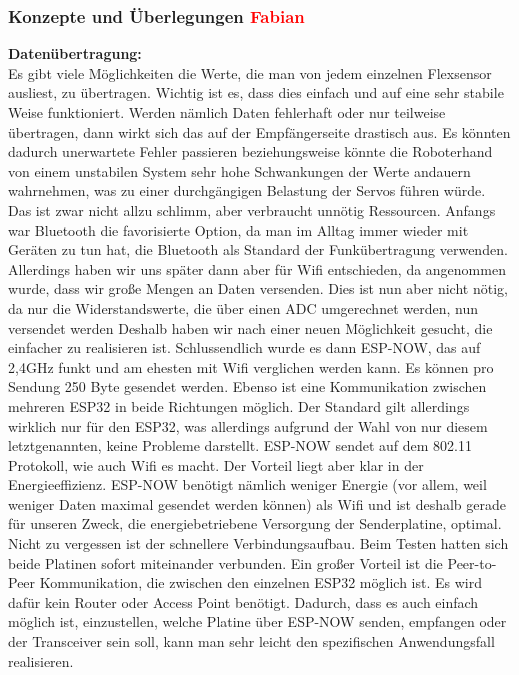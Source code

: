 \documentclass[11pt]{article}
\begin{document}
\subsubsection{Konzepte und Überlegungen \textcolor{red}{Fabian}}
\textbf{Datenübertragung:}
\\
Es gibt viele Möglichkeiten die Werte, die man von jedem einzelnen Flexsensor ausliest, zu übertragen. Wichtig ist es, dass 
dies einfach und auf eine sehr stabile Weise funktioniert. Werden nämlich Daten fehlerhaft oder nur teilweise übertragen, dann 
wirkt sich das auf der Empfängerseite drastisch aus. Es könnten dadurch unerwartete Fehler passieren beziehungsweise könnte die 
Roboterhand von einem unstabilen System sehr hohe Schwankungen der Werte andauern wahrnehmen, was zu einer durchgängigen 
Belastung der Servos führen würde. Das ist zwar nicht allzu schlimm, aber verbraucht unnötig Ressourcen. Anfangs war Bluetooth 
die favorisierte Option, da man im Alltag immer wieder mit Geräten zu tun hat, die Bluetooth als Standard der Funkübertragung 
verwenden. Allerdings haben wir uns später dann aber für Wifi entschieden, da angenommen wurde, dass wir große Mengen an Daten 
versenden. Dies ist nun aber nicht nötig, da nur die Widerstandswerte, die über einen ADC umgerechnet werden, nun versendet 
werden Deshalb haben wir nach einer neuen Möglichkeit gesucht, die einfacher zu realisieren ist. Schlussendlich wurde es dann 
ESP-NOW, das auf 2,4GHz funkt und am ehesten mit Wifi verglichen werden kann. Es können pro Sendung 250 Byte gesendet werden. 
Ebenso ist eine Kommunikation zwischen mehreren ESP32 in beide Richtungen möglich. Der Standard gilt allerdings wirklich nur 
für den ESP32, was allerdings aufgrund der Wahl von nur diesem letztgenannten, keine Probleme darstellt. ESP-NOW sendet auf dem 
802.11 Protokoll, wie auch Wifi es macht. Der Vorteil liegt aber klar in der Energieeffizienz. ESP-NOW benötigt nämlich weniger 
Energie (vor allem, weil weniger Daten maximal gesendet werden können) als Wifi und ist deshalb gerade für unseren Zweck, die 
energiebetriebene Versorgung der Senderplatine, optimal. Nicht zu vergessen ist der schnellere Verbindungsaufbau. Beim Testen 
hatten sich beide Platinen sofort miteinander verbunden. Ein großer Vorteil ist die Peer-to-Peer Kommunikation, die zwischen 
den einzelnen ESP32 möglich ist. Es wird dafür kein Router oder Access Point benötigt. Dadurch, dass es auch einfach möglich 
ist, einzustellen, welche Platine über ESP-NOW senden, empfangen oder der Transceiver sein soll, kann man sehr leicht den 
spezifischen Anwendungsfall realisieren. \\
\end{document}
